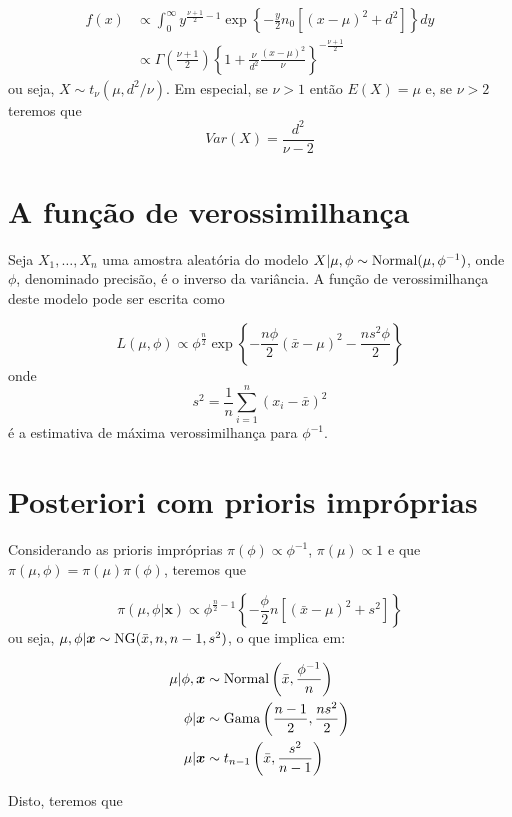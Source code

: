 \documentclass[
  letterpaper,
  DIV=11,
  numbers=noendperiod]{scrreprt}
\theoremstyle{definition}
\theoremstyle{definition}
\theoremstyle{plain}
\theoremstyle{remark}
\begin{document}
\[\begin{align}f(x)&\propto \int_0^\infty y^{\frac{\nu+1}{2}-1}\exp\left\{-\frac{y}{2}n_0\left[(x-\mu)^2 + d^2\right]\right\}dy \\&\propto \Gamma\left(\frac{\nu+1}{2}\right)\left\{1+\frac{\nu}{d^2}\frac{(x-\mu)^2}{\nu}\right\}^{-\frac{\nu+1}{2}}\end{align}\]
ou seja, \(X\sim t_{\nu}(\mu, d^2/\nu)\). Em especial, se \(\nu>1\)
então \(E(X)=\mu\) e, se \(\nu>2\) teremos que
\[Var(X)=\frac{d^2}{\nu-2}\]

\section{A função de
verossimilhança}\label{a-funuxe7uxe3o-de-verossimilhanuxe7a-1}

Seja \(X_1,\ldots,X_n\) uma amostra aleatória do modelo
\(X|\mu,\phi\sim\hbox{Normal}(\mu,\phi^{-1})\), onde \(\phi\),
denominado precisão, é o inverso da variância. A função de
verossimilhança deste modelo pode ser escrita como

\[L(\mu,\phi)\propto \phi^{\frac{n}{2}}\exp\left\{-\frac{n\phi}{2}(\bar{x}-\mu)^2 -\frac{ns^2\phi}{2}\right\}\]
onde \[s^2=\frac{1}{n}\sum_{i=1}^n(x_i-\bar{x})^2\] é a estimativa de
máxima verossimilhança para \(\phi^{-1}\).

\section{Posteriori com prioris
impróprias}\label{posteriori-com-prioris-impruxf3prias}

Considerando as prioris impróprias \(\pi(\phi)\propto \phi^{-1}\),
\(\pi(\mu)\propto 1\) e que \(\pi(\mu,\phi)=\pi(\mu)\pi(\phi)\), teremos
que

\[\pi(\mu,\phi|\boldsymbol{x})\propto \phi^{\frac{n}{2}-1}\left\{-\frac{\phi}{2}n\left[ (\bar{x}-\mu)^2 +s^2\right]\right\}\]
ou seja, \(\mu,\phi|\boldsymbol{x}\sim\hbox{NG}(\bar{x},n,n-1,s^2)\), o
que implica em:

\[\begin{align}
\mu|\phi,\boldsymbol{x}&\sim\hbox{Normal}\left(\bar{x},\frac{\phi^{-1}}{n}\right)\\
\phi|\boldsymbol{x}&\sim\hbox{Gama}\left(\frac{n-1}{2},\frac{ns^2}{2}\right)\\
\mu|\boldsymbol{x}&\sim t_{n-1}\left(\bar{x},\frac{s^2}{n-1}\right)
\end{align}\]

Disto, teremos que
\end{document}
